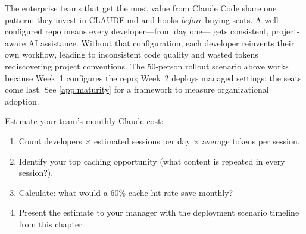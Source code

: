 \begin{keyinsight}
The enterprise teams that get the most value from Claude Code share
one pattern: they invest in CLAUDE.md and hooks \emph{before} buying
seats. A well-configured repo means every developer---from day one---
gets consistent, project-aware AI assistance. Without that
configuration, each developer reinvents their own workflow, leading
to inconsistent code quality and wasted tokens rediscovering project
conventions. The 50-person rollout scenario above works because
Week~1 configures the repo; Week~2 deploys managed settings; the seats
come last.
See \cref{app:maturity} for a framework to measure organizational adoption.
\end{keyinsight}

\begin{trybox}
Estimate your team's monthly Claude cost:
\begin{enumerate}
  \item Count developers $\times$ estimated sessions per day
    $\times$ average tokens per session.
  \item Identify your top caching opportunity (what content
    is repeated in every session?).
  \item Calculate: what would a 60\% cache hit rate save monthly?
  \item Present the estimate to your manager with the deployment
    scenario timeline from this chapter.
\end{enumerate}
\end{trybox}
